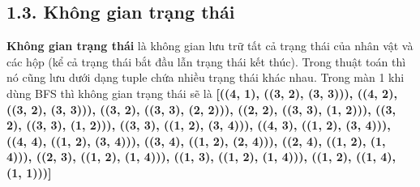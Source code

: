 \documentclass[a4paper,12pt]{article}
\begin{document}
\subsection*{1.3. Không gian trạng thái}
\hspace*{7mm}\textbf{Không gian trạng thái} là không gian lưu trữ tất cả trạng thái của nhân vật và các hộp (kể cả trạng thái bắt đầu lẫn trạng thái kết thúc). Trong thuật toán thì nó cũng lưu dưới dạng tuple chứa nhiều trạng thái khác nhau. Trong màn 1 khi dùng BFS thì không gian trạng thái sẽ là \textbf{[((4, 1), ((3, 2), (3, 3))), ((4, 2), ((3, 2), (3, 3))), ((3, 2), ((3, 3), (2, 2))), ((2, 2), ((3, 3), (1, 2))), ((3, 2), ((3, 3), (1, 2))), ((3, 3), ((1, 2), (3, 4))), ((4, 3), ((1, 2), (3, 4))), ((4, 4), ((1, 2), (3, 4))), ((3, 4), ((1, 2), (2, 4))), ((2, 4), ((1, 2), (1, 4))), ((2, 3), ((1, 2), (1, 4))), ((1, 3), ((1, 2), (1, 4))), ((1, 2), ((1, 4), (1, 1)))]}
\end{document}

